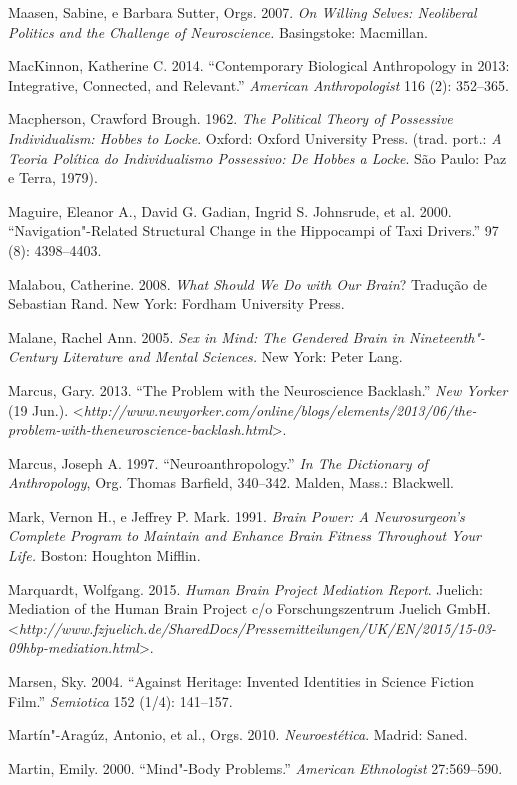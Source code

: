 Maasen, Sabine, e Barbara Sutter, Orgs. 2007. \emph{On Willing Selves:
Neoliberal Politics and the Challenge of Neuroscience.} Basingstoke:
Macmillan.

MacKinnon, Katherine C. 2014. ``Contemporary Biological Anthropology in
2013: Integrative, Connected, and Relevant.'' \emph{American
Anthropologist} 116 (2): 352--365.

Macpherson, Crawford Brough. 1962. \emph{The Political Theory of
Possessive Individualism: Hobbes to Locke}. Oxford: Oxford University
Press. (trad. port.: \emph{A Teoria Política do Individualismo
Possessivo: De Hobbes a Locke}. São Paulo: Paz e Terra, 1979).

Maguire, Eleanor A., David G. Gadian, Ingrid S. Johnsrude, et al. 2000.
``Navigation"-Related Structural Change in the Hippocampi of Taxi
Drivers.'' \emph{} 97 (8): 4398--4403.

Malabou, Catherine. 2008. \emph{What Should We Do with Our Brain}?
Tradução de Sebastian Rand. New York: Fordham University Press.

Malane, Rachel Ann. 2005. \emph{Sex in Mind:} \emph{The Gendered Brain
in Nineteenth"-Century Literature and Mental Sciences.} New York: Peter
Lang.

Marcus, Gary. 2013. ``The Problem with the Neuroscience Backlash.''
\emph{New Yorker} (19 Jun.).
\textless{}\emph{http://www.newyorker.com/online/blogs/elements/2013/06/the-problem-with-theneuroscience-backlash.html}\textgreater{}.

Marcus, Joseph A. 1997. ``Neuroanthropology.'' \emph{In The Dictionary
of Anthropology}, Org. Thomas Barfield, 340--342. Malden, Mass.:
Blackwell.

Mark, Vernon H., e Jeffrey P. Mark. 1991. \emph{Brain Power: A
Neurosurgeon's Complete Program to Maintain and Enhance Brain Fitness
Throughout Your Life.} Boston: Houghton Mifflin.

Marquardt, Wolfgang. 2015. \emph{Human Brain Project Mediation Report}.
Juelich: Mediation of the Human Brain Project c/o Forschungszentrum
Juelich GmbH.
\textless{}\emph{http://www.fzjuelich.de/SharedDocs/Pressemitteilungen/UK/EN/2015/15-03-09hbp-mediation.html}\textgreater{}.

Marsen, Sky. 2004. ``Against Heritage: Invented Identities in Science
Fiction Film.'' \emph{Semiotica} 152 (1/4): 141--157.

Martín"-Aragúz, Antonio, et al., Orgs. 2010. \emph{Neuroestética}.
Madrid: Saned.

Martin, Emily. 2000. ``Mind"-Body Problems.'' \emph{American Ethnologist}
27:569--590.

